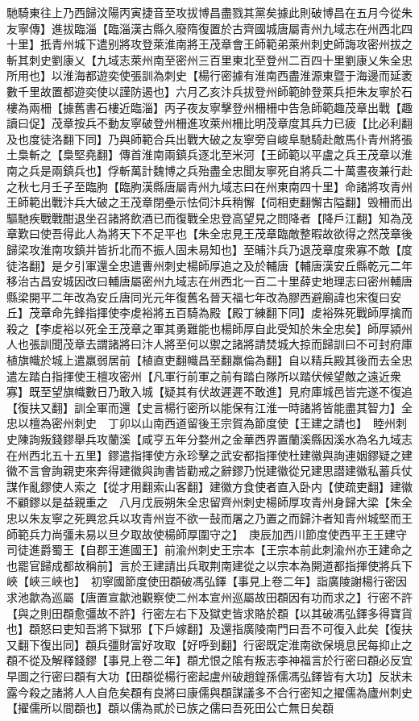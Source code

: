 馳騎東往上乃西歸汶陽丙寅捷音至攻拔博昌盡戮其黨矣據此則破博昌在五月今從朱友寧傳】進拔臨淄【臨淄漢古縣久廢隋復置於古齊國城唐屬青州九域志在州西北四十里】扺青州城下遣别將攻登萊淮南將王茂章會王師範弟萊州刺史師誨攻密州拔之斬其刺史劉康乂【九域志萊州南至密州三百里東北至登州二百四十里劉康乂朱全忠所用也】以淮海都遊奕使張訓為刺史【楊行密據有淮南西盡淮源東暨于海邊而延袤數千里故置都遊奕使以謹防遏也】六月乙亥汴兵拔登州師範帥登萊兵拒朱友寧於石樓為兩柵【據舊書石樓近臨淄】丙子夜友寧擊登州柵柵中告急師範趣茂章出戰【趣讀曰促】茂章按兵不動友寧破登州柵進攻萊州柵比明茂章度其兵力已疲【比必利翻及也度徒洛翻下同】乃與師範合兵出戰大破之友寧旁自峻阜馳騎赴敵馬仆青州將張土梟斬之【梟堅堯翻】傳首淮南兩鎮兵逐北至米河【王師範以平盧之兵王茂章以淮南之兵是兩鎮兵也】俘斬萬計魏博之兵殆盡全忠聞友寧死自將兵二十萬晝夜兼行赴之秋七月壬子至臨胊【臨朐漢縣唐屬青州九域志曰在州東南四十里】命諸將攻青州王師範出戰汴兵大破之王茂章閉壘示怯伺汴兵稍懈【伺相吏翻懈古隘翻】毁柵而出驅馳疾戰戰酣退坐召諸將飲酒已而復戰全忠登高望見之問降者【降戶江翻】知為茂章歎曰使吾得此人為將天下不足平也【朱全忠見王茂章臨敵整暇故欲得之然茂章後歸梁攻淮南攻鎮并皆折北而不振人固未易知也】至晡汴兵乃退茂章度衆寡不敵【度徒洛翻】是夕引軍還全忠遣曹州刺史楊師厚追之及於輔唐【輔唐漢安丘縣乾元二年移治古昌安城因改曰輔唐屬密州九域志在州西北一百二十里薛史地理志曰密州輔唐縣梁開平二年改為安丘唐同光元年復舊名晉天福七年改為膠西避廟諱也宋復曰安丘】茂章命先鋒指揮使李䖍裕將五百騎為殿【殿丁練翻下同】䖍裕殊死戰師厚擒而殺之【李䖍裕以死全王茂章之軍其勇難能也楊師厚自此受知於朱全忠矣】師厚潁州人也張訓聞茂章去謂諸將曰汴人將至何以禦之諸將請焚城大掠而歸訓曰不可封府庫植旗幟於城上遣羸弱居前【植直吏翻幟昌至翻羸倫為翻】自以精兵殿其後而去全忠遣左踏白指揮使王檀攻密州【凡軍行前軍之前有踏白隊所以踏伏候望敵之遠近衆寡】既至望旗幟數日乃敢入城【疑其有伏故遲遲不敢進】見府庫城邑皆完遂不復追【復扶又翻】訓全軍而還【史言楊行密所以能保有江淮一時諸將皆能盡其智力】全忠以檀為密州刺史　丁卯以山南西道留後王宗賀為節度使【王建之請也】　睦州刺史陳詢叛錢鏐舉兵攻蘭溪【咸亨五年分婺州之金華西界置蘭溪縣因溪水為名九域志在州西北五十五里】鏐遣指揮使方永珍擊之武安都指揮使杜建徽與詢連姻鏐疑之建徽不言會詢親吏來奔得建徽與詢書皆勸戒之辭鏐乃悦建徽從兄建思譛建徽私蓄兵仗謀作亂鏐使人索之【從才用翻索山客翻】建徽方食使者直入卧内【使疏吏翻】建徽不顧鏐以是益親重之　八月戊辰朔朱全忠留齊州刺史楊師厚攻青州身歸大梁【朱全忠以朱友寧之死興忿兵以攻青州豈不欲一鼔而屠之乃置之而歸汴者知青州城堅而王師範兵力尚彊未易以旦夕取故使楊師厚圍守之】　庚辰加西川節度使西平王王建守司徒進爵蜀王【自郡王進國王】前渝州刺史王宗本【王宗本前此刺渝州亦王建命之也罷官歸成都故稱前】言於王建請出兵取荆南建從之以宗本為開道都指揮使將兵下峽【峽三峽也】　初寧國節度使田頵破馮弘鐸【事見上卷二年】詣廣陵謝楊行密因求池歙為巡屬【唐置宣歙池觀察使二州本宣州巡屬故田頵因有功而求之】行密不許【與之則田頵愈彊故不許】行密左右下及獄吏皆求賂於頵【以其破馮弘鐸多得寶貨也】頵怒曰吏知吾將下獄邪【下戶嫁翻】及還指廣陵南門曰吾不可復入此矣【復扶又翻下復出同】頵兵彊財富好攻取【好呼到翻】行密既定淮南欲保境息民每抑止之頵不從及解釋錢鏐【事見上卷二年】頵尤恨之隂有叛志李神福言於行密曰頵必反宜早圖之行密曰頵有大功【田頵從楊行密起盧州破趙鍠孫儒馮弘鐸皆有大功】反狀未露今殺之諸將人人自危矣頵有良將曰康儒與頵謀議多不合行密知之擢儒為廬州刺史【擢儒所以間頵也】頵以儒為貳於已族之儒曰吾死田公亡無日矣頵
